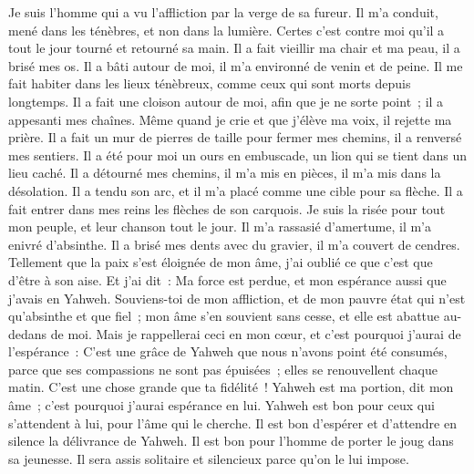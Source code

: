 \begin{multicols}{2}
\VerseOne{} Je suis l'homme qui a vu l'affliction par la verge de sa fureur.
Il m'a conduit, mené dans les ténèbres, et non dans la lumière.
Certes c'est contre moi qu'il a tout le jour tourné et retourné sa main.
 Il a fait vieillir ma chair et ma peau, il a brisé mes os.
Il a bâti autour de moi, il m'a environné de venin et de peine.
Il me fait habiter dans les lieux ténèbreux, comme ceux qui sont morts depuis longtemps.
 Il a fait une cloison autour de moi, afin que je ne sorte point~; il a appesanti mes chaînes.
Même quand je crie et que j'élève ma voix, il rejette ma prière.
Il a fait un mur de pierres de taille pour fermer mes chemins, il a renversé mes sentiers.
 Il a été pour moi un ours en embuscade, un lion qui se tient dans un lieu caché.
Il a détourné mes chemins, il m'a mis en pièces, il m'a mis dans la désolation.
Il a tendu son arc, et il m'a placé comme une cible pour sa flèche.
 Il a fait entrer dans mes reins les flèches de son carquois.
Je suis la risée pour tout mon peuple, et leur chanson tout le jour.
Il m'a rassasié d'amertume, il m'a enivré d'absinthe.
 Il a brisé mes dents avec du gravier, il m'a couvert de cendres.
Tellement que la paix s'est éloignée de mon âme, j'ai oublié ce que c'est que d'être à son aise.
Et j'ai dit~: Ma force est perdue, et mon espérance aussi que j'avais en Yahweh.
 Souviens-toi de mon affliction, et de mon pauvre état qui n'est qu'absinthe et que fiel~;
mon âme s'en souvient sans cesse, et elle est abattue au-dedans de moi.
Mais je rappellerai ceci en mon cœur, et c'est pourquoi j'aurai de l'espérance~:
 C'est une grâce de Yahweh que nous n'avons point été consumés, parce que ses compassions ne sont pas épuisées~;
elles se renouvellent chaque matin. C'est une chose grande que ta fidélité~!
Yahweh est ma portion, dit mon âme~; c'est pourquoi j'aurai espérance en lui.
 Yahweh est bon pour ceux qui s'attendent à lui, pour l'âme qui le cherche.
Il est bon d'espérer et d'attendre en silence la délivrance de Yahweh.
Il est bon pour l'homme de porter le joug dans sa jeunesse.
 Il sera assis solitaire et silencieux parce qu'on le lui impose.

\end{multicols}
